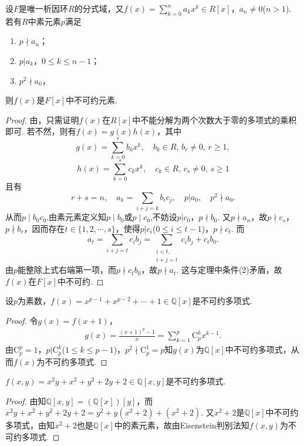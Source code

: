\documentclass[../../main.tex]{subfiles}%
\begin{document}
\begin{theorem}\label{theorem:抽象代数--定理2.7.5}
设$F$是唯一析因环$R$的分式域，又$f(x) = \sum\limits_{k=0}^n a_kx^k \in R[x]$，$a_n \neq 0$($n > 1$). 若有$R$中素元素$p$满足
\begin{enumerate}[(1)]
\item $p \nmid a_n$；
\item $p|a_k$，$0 \leqslant k \leqslant n-1$；
\item $p^2 \nmid a_0$，
\end{enumerate}
则$f(x)$是$F[x]$中不可约元素.
\end{theorem}
\begin{proof}

由，只需证明$f(x)$在$R[x]$中不能分解为两个次数大于零的多项式的乘积即可. 若不然，则有$f(x) = g(x)h(x)$，其中
\[
g(x) = \sum\limits_{k=0}^r b_kx^k, \quad b_k \in R, \, b_r \neq 0, \, r \geqslant 1,
\]
\[
h(x) = \sum\limits_{k=0}^s c_kx^k, \quad c_k \in R, \, c_s \neq 0, \, s \geqslant 1
\]
且有
\[
r + s = n, \quad a_k = \sum\limits_{i+j=k} b_ic_j, \quad p|a_0, \quad p^2 \nmid a_0.
\]
从而$p\mid b_0c_0$.由素元素定义知$p\mid b_0$或$p\mid c_0$,不妨设$p|c_0$，$p \nmid b_0$. 又$p \nmid a_n$，故$p \nmid c_s$，$p \nmid b_r$，因而存在$t\in \{1,2,\cdots,s\}$，使得$p|c_i$($0 \leqslant i \leqslant t-1$)，$p \nmid c_t$. 而
\[
a_t = \sum\limits_{i+j=t} c_ib_j = \sum\limits_{\substack{i<t, \\ i+j=t}}c_ib_j + c_tb_0.
\]
由$p$能整除上式右端第一项，而$p \nmid c_tb_0$，故$p \nmid a_t$. 这与定理中条件(2)矛盾，故$f(x)$在$F[x]$中不可约.

\end{proof}

\begin{example}
设$p$为素数，$f(x) = x^{p-1} + x^{p-2} + \cdots + 1 \in \mathbb{Q}[x]$是不可约多项式.
\end{example}
\begin{proof}

令$g(x) = f(x+1)$，
\begin{align*}
g(x) = \frac{(x+1)^p - 1}{x} = \sum\limits_{k=1}^p \mathrm{C}_p^k x^{k-1}.
\end{align*}
由$\mathrm{C}_p^p = 1$，$p|\mathrm{C}_p^k$($1 \leqslant k \leqslant p-1$)，$p^2 \nmid \mathrm{C}_p^1 = p$知$g(x)$为$\mathbb{Q}[x]$中不可约多项式，从而$f(x)$为不可约多项式.

\end{proof}

\begin{example}
$f(x, y) = x^2y + x^2 + y^2 + 2y + 2 \in \mathbb{Q}[x, y]$是不可约多项式.
\end{example}
\begin{proof}

由知$\mathbb{Q}[x, y] = (\mathbb{Q}[x])[y]$，而$x^2y + x^2 + y^2 + 2y + 2 = y^2 + y(x^2 + 2) + (x^2 + 2)$. 又$x^2 + 2$是$\mathbb{Q}[x]$中不可约多项式，由知$x^2 + 2$也是$\mathbb{Q}[x]$中的素元素，故由Eisenstein判别法知$f(x, y)$为不可约多项式.

\end{proof}
\end{document}
